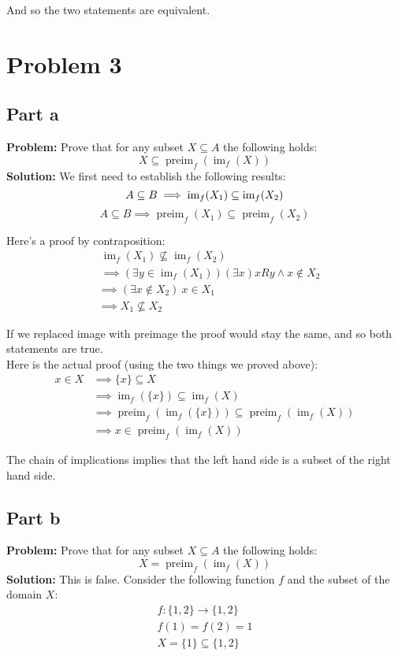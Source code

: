 \documentclass{article}
\begin{document}
And so the two statements are equivalent.

\section*{Problem 3}
\subsection*{Part a}
\textbf{Problem:} Prove that for any subset $X\subseteq A$ the following holds:
$$X\subseteq\operatorname{preim}_f(\operatorname{im}_f(X))$$
\textbf{Solution:} We first need to establish the following results:
$$A\subseteq B\implies\operatorname{im}_f(X_1)\subseteq\operatorname{im}_f(X_2)\\$$
$$A\subseteq B\implies\operatorname{preim}_f(X_1)\subseteq\operatorname{preim}_f(X_2)$$

Here's a proof by contraposition:
\begin{align*}
  &\ \operatorname{im}_f(X_1)\not\subseteq\operatorname{im}_f(X_2) \tag{assume negative consequent}\\
  &\ \implies (\exists y\in\operatorname{im}_f(X_1))(\exists x)xRy\wedge x\not\in X_2\\
  &\implies(\exists x\not\in X_2)\ x\in X_1\\
  &\implies X_1\not\subseteq X_2 \tag{prove negative antecedent}
\end{align*}

If we replaced image with preimage the proof would stay the same, and so both statements are true.
\\

Here is the actual proof (using the two things we proved above):
\begin{align*}
  x\in X&\implies\{x\}\subseteq X\\
  &\implies\operatorname{im}_f(\{x\})\subseteq \operatorname{im}_f(X)\\
  &\implies\operatorname{preim}_f(\operatorname{im}_f(\{x\}))\subseteq \operatorname{preim}_f(\operatorname{im}_f(X))\\
  &\implies x\in\operatorname{preim}_f(\operatorname{im}_f(X))
\end{align*}

The chain of implications implies that the left hand side is a subset of the right hand side.

\subsection*{Part b}
\textbf{Problem:} Prove that for any subset $X\subseteq A$ the following holds:
$$X=\operatorname{preim}_f(\operatorname{im}_f(X))$$
\textbf{Solution:} This is false. Consider the following function $f$ and the subset of the domain $X$:
\begin{gather*}
  f:\{1,2\}\to\{1,2\}\\
  f(1)=f(2)=1\\
  X=\{1\}\subseteq\{1,2\}
\end{gather*}
\end{document}
